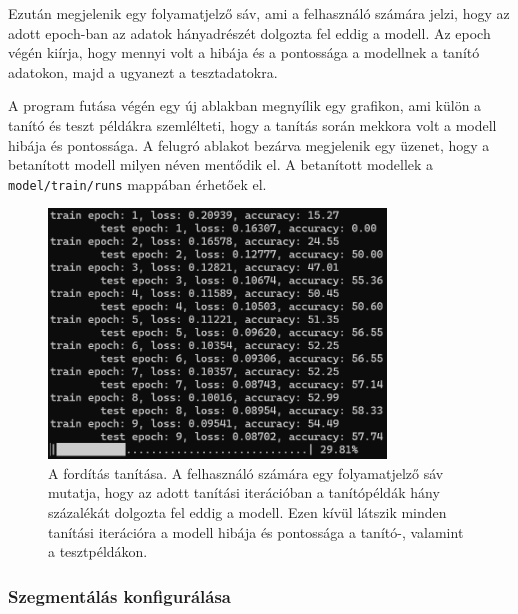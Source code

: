 Ezután megjelenik egy folyamatjelző sáv, ami a felhasználó számára
jelzi, hogy az adott epoch-ban az adatok hányadrészét dolgozta fel eddig
a modell. Az epoch végén kiírja, hogy mennyi volt a hibája és a pontossága
a modellnek a tanító adatokon, majd a ugyanezt a tesztadatokra.

A program futása végén egy új ablakban megnyílik egy grafikon, ami külön
a tanító és teszt példákra szemlélteti, hogy a tanítás során mekkora volt
a modell hibája és pontossága. A felugró ablakot bezárva megjelenik egy üzenet,
hogy a betanított modell milyen néven mentődik el. A betanított
modellek a \texttt{model/train/runs} mappában érhetőek el. 

\begin{figure}[H]
	\centering
	\includegraphics[width=0.8\textwidth]{images/translation_train.png}
	\caption[A fordítás tanítása]{A fordítás tanítása. A felhasználó számára egy folyamatjelző sáv
        mutatja, hogy az adott tanítási iterációban a tanítópéldák hány százalékát dolgozta fel
        eddig a modell. Ezen kívül látszik minden tanítási iterációra a modell hibája és pontossága
        a tanító-, valamint a tesztpéldákon.}
	\label{fig:train}
\end{figure}

\subsubsection{Szegmentálás konfigurálása}

